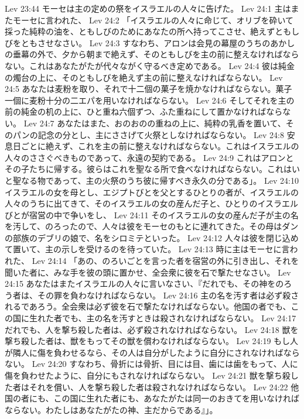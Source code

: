 Lev 23:44  モーセは主の定めの祭をイスラエルの人々に告げた。
Lev 24:1  主はまたモーセに言われた、
Lev 24:2  「イスラエルの人々に命じて、オリブを砕いて採った純粋の油を、ともしびのためにあなたの所へ持ってこさせ、絶えずともしびをともさせなさい。
Lev 24:3  すなわち、アロンは会見の幕屋のうちのあかしの垂幕の外で、夕から朝まで絶えず、そのともしびを主の前に整えなければならない。これはあなたがたが代々ながく守るべき定めである。
Lev 24:4  彼は純金の燭台の上に、そのともしびを絶えず主の前に整えなければならない。
Lev 24:5  あなたは麦粉を取り、それで十二個の菓子を焼かなければならない。菓子一個に麦粉十分の二エパを用いなければならない。
Lev 24:6  そしてそれを主の前の純金の机の上に、ひと重ね六個ずつ、ふた重ねにして置かなければならない。
Lev 24:7  あなたはまた、おのおのの重ねの上に、純粋の乳香を置いて、そのパンの記念の分とし、主にささげて火祭としなければならない。
Lev 24:8  安息日ごとに絶えず、これを主の前に整えなければならない。これはイスラエルの人々のささぐべきものであって、永遠の契約である。
Lev 24:9  これはアロンとその子たちに帰する。彼らはこれを聖なる所で食べなければならない。これはいと聖なる物であって、主の火祭のうち彼に帰すべき永久の分である」。
Lev 24:10  イスラエルの女を母とし、エジプトびとを父とするひとりの者が、イスラエルの人々のうちに出てきて、そのイスラエルの女の産んだ子と、ひとりのイスラエルびとが宿営の中で争いをし、
Lev 24:11  そのイスラエルの女の産んだ子が主の名を汚して、のろったので、人々は彼をモーセのもとに連れてきた。その母はダンの部族のデブリの娘で、名をシロミテといった。
Lev 24:12  人々は彼を閉じ込めて置いて、主の示しを受けるのを待っていた。
Lev 24:13  時に主はモーセに言われた、
Lev 24:14  「あの、のろいごとを言った者を宿営の外に引き出し、それを聞いた者に、みな手を彼の頭に置かせ、全会衆に彼を石で撃たせなさい。
Lev 24:15  あなたはまたイスラエルの人々に言いなさい、『だれでも、その神をのろう者は、その罪を負わなければならない。
Lev 24:16  主の名を汚す者は必ず殺されるであろう。全会衆は必ず彼を石で撃たなければならない。他国の者でも、この国に生れた者でも、主の名を汚すときは殺されなければならない。
Lev 24:17  だれでも、人を撃ち殺した者は、必ず殺されなければならない。
Lev 24:18  獣を撃ち殺した者は、獣をもってその獣を償わなければならない。
Lev 24:19  もし人が隣人に傷を負わせるなら、その人は自分がしたように自分にされなければならない。
Lev 24:20  すなわち、骨折には骨折、目には目、歯には歯をもって、人に傷を負わせたように、自分にもされなければならない。
Lev 24:21  獣を撃ち殺した者はそれを償い、人を撃ち殺した者は殺されなければならない。
Lev 24:22  他国の者にも、この国に生れた者にも、あなたがたは同一のおきてを用いなければならない。わたしはあなたがたの神、主だからである』」。
